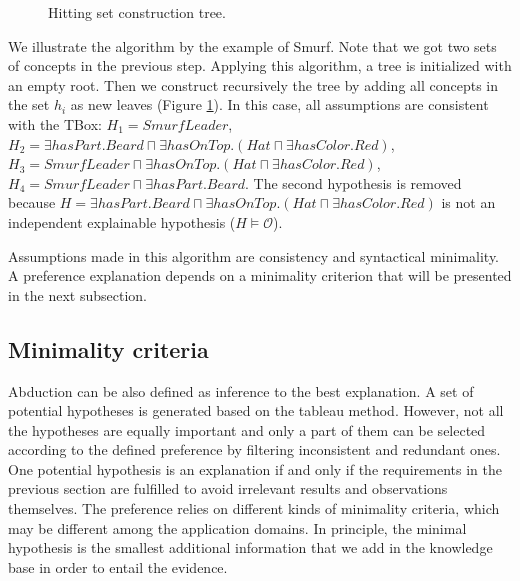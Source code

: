 \documentclass{article}
\begin{document}
\begin{figure}
\centering
{}
\caption{Hitting set construction tree.\label{fig:hittingtree}}
\end{figure}
We illustrate the algorithm by the example of Smurf. Note that we got two sets of concepts in the previous step.
Applying this algorithm, a tree is initialized with an empty root. Then we construct recursively the tree by adding all concepts
in the set $h_i$ as new leaves (Figure \ref{fig:hittingtree}). In this case, all
assumptions are consistent with the TBox:
$H_1=SmurfLeader$, $H_2=\exists hasPart.Beard \sqcap \exists hasOnTop.(Hat\sqcap\exists hasColor.Red)$, 
$H_3=SmurfLeader\sqcap\exists hasOnTop.(Hat\sqcap \exists hasColor.Red)$, $H_4=SmurfLeader \sqcap \exists hasPart.Beard$. 
The second hypothesis is removed because $H=\exists hasPart.Beard \sqcap \exists hasOnTop.(Hat\sqcap\exists hasColor.Red)$ 
is not an independent explainable hypothesis ($H\vDash \mathcal{O}$). 

Assumptions made in this algorithm are consistency and syntactical minimality. 
A preference explanation depends on a minimality criterion that will be presented in the next subsection.

\subsection{Minimality criteria}
Abduction can be also defined as inference to the best explanation. A set of potential hypotheses is generated based on the tableau method. 
However, not all the hypotheses are equally important and only a part of them can be selected according to the defined preference by filtering inconsistent and redundant ones. 
One potential hypothesis is an explanation if and only if the requirements in the previous section are fulfilled to avoid irrelevant results and observations themselves.
The preference relies on different kinds of minimality criteria, which may be different among the application domains.
In principle, the minimal hypothesis is the smallest additional information that we add in the knowledge base in order to entail the evidence.
\end{document}
